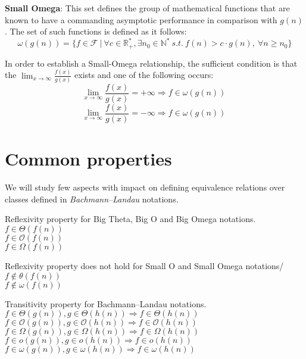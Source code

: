 \begin{definition}   
 \textbf{Small Omega}:
  This set defines the group of mathematical functions that are known to have a commanding asymptotic performance in comparison with  $g(n)$.
  The set of such functions is defined as it follows:
  \[\omega(g(n)) = \lbrace f \in \mathcal{F}\ |\ \forall c \in \mathbb{R}^{*}_{+}, \exists n_{0} \in \mathbb{N}^{*}\ s.t.\  f(n) > c \cdot g(n),\  \forall n \geq n_{0} \rbrace\]
  \end{definition}  
  \begin{lemma}
In order to establish a Small-Omega relationship, the sufficient condition is that the $ \lim_{x\to\infty} \frac{f(x)}{g(x)}$ exists and one of the following occurs:
  \[  \lim_{x\to\infty} \frac{f(x)}{g(x)} = +\infty \Rightarrow f \in \omega(g(n))\ \]   
  \[  \lim_{x\to\infty} \frac{f(x)}{g(x)} = -\infty \Rightarrow f \in \omega(g(n))\ \]  
  \end{lemma}

\section{Common properties}
We will study few aspects with impact on defining equivalence relations over classes defined in \textit{Bachmann–Landau} notations.
 \hfill\break
 \begin{theorem} Reflexivity property for Big Theta, Big O and Big Omega notations.  \\  $ f \in \Theta(f(n)) $ \\$ f \in \mathcal{O}(f(n)) $ \\$ f \in \Omega(f(n)) $
 \end{theorem}

\begin{theorem} Reflexivity property does not hold for Small O and Small Omega notations/ \\
 $ f \notin \theta(f(n)) $ \\$ f \notin \omega(f(n)) $ 
\end{theorem}

\begin{theorem} Transitivity property for Bachmann–Landau notations.  \\  $ f \in \Theta(g(n)),  g \in \Theta(h(n)) \Rightarrow  f \in \Theta(h(n))$ \\
 $ f \in \mathcal{O}(g(n)),  g \in \mathcal{O}(h(n)) \Rightarrow  f \in \mathcal{O}(h(n))$ \\
 $ f \in \Omega(g(n)),  g \in \Omega(h(n)) \Rightarrow  f \in \Omega(h(n))$ \\
 $ f \in o(g(n)),  g \in o(h(n)) \Rightarrow  f \in o(h(n))$ \\
 $ f \in \omega(g(n)),  g \in \omega(h(n)) \Rightarrow  f \in \omega(h(n))$
\end{theorem} 

